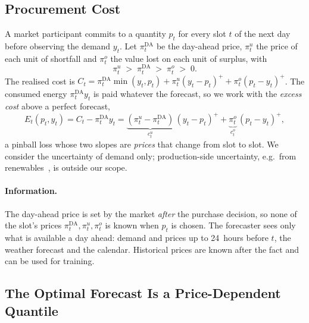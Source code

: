 \subsection{Procurement Cost}

A market participant commits to a quantity $p_t$ for every slot $t$ of the
next day before observing the demand $y_t$.  Let $\pi^{\mathrm{DA}}_t$ be the
day-ahead price, $\pi^u_t$ the price of each unit of shortfall and $\pi^o_t$
the value lost on each unit of surplus, with
\begin{equation}
    \pi^{u}_t \;>\; \pi^{\mathrm{DA}}_t \;>\; \pi^{o}_t \;>\; 0.
    \label{eq:price-order}
\end{equation}
The realised cost is
$C_t = \pi^{\mathrm{DA}}_t \min(y_t, p_t) + \pi^{u}_t (y_t - p_t)^{+} +
\pi^{o}_t (p_t - y_t)^{+}$.  The consumed energy $\pi^{\mathrm{DA}}_t y_t$ is
paid whatever the forecast, so we work with the \emph{excess cost} above a
perfect forecast,
\begin{equation}
    E_t(p_t, y_t) = C_t - \pi^{\mathrm{DA}}_t y_t
    = \underbrace{(\pi^{u}_t - \pi^{\mathrm{DA}}_t)}_{c^{u}_t}\,(y_t - p_t)^{+}
    + \underbrace{\pi^{o}_t}_{c^{o}_t}\,(p_t - y_t)^{+},
    \label{eq:excess}
\end{equation}
a pinball loss whose two slopes are \emph{prices} that change from slot to
slot.  We consider the uncertainty of demand only; production-side
uncertainty, e.g.\ from renewables~\parencite{morales2014integrating}, is
outside our scope.

\paragraph*{Information.}  The day-ahead price is set by the market
\emph{after} the purchase decision, so none of the slot's prices
$\pi^{\mathrm{DA}}_t,\pi^u_t,\pi^o_t$ is known when $p_t$ is chosen.  The
forecaster sees only what is available a day ahead: demand and prices up to
24~hours before $t$, the weather forecast and the calendar.  Historical prices
are known after the fact and can be used for training.

\subsection{The Optimal Forecast Is a Price-Dependent Quantile}
\label{sec:newsvendor}

